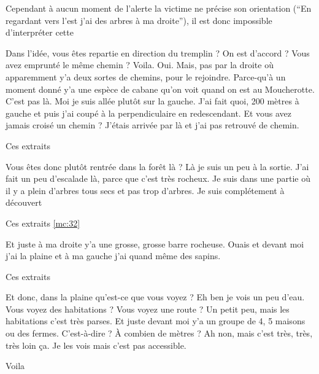 Cependant à aucun moment de l'alerte la
victime ne précise son orientation (\eg \enquote{En regardant vers
  l'est j'ai des arbres à ma droite}), il est donc impossible
d'interpréter cette 




\begin{dialogue*}
  \Sec {} Dans l’idée, vous êtes repartie en direction
  du tremplin ? On est d’accord ? Vous avez emprunté le même chemin ?
  \Req {} Voila. Oui.  Mais, pas par la
  droite où  apparemment y’a deux sortes de chemins,
  pour le rejoindre.  Parce-qu’à un moment donné y’a
  une espèce de cabane qu’on voit quand on est au Moucherotte. C’est
  pas là.  Moi je suis allée plutôt sur la
  gauche. J’ai fait quoi, 200 mètres à gauche et  puis
  j’ai coupé à la perpendiculaire en redescendant.
  \Sec {} Et vous avez jamais croisé un chemin ?
  \Req {} J’étais arrivée par là et j’ai pas retrouvé de
  chemin.
\end{dialogue*}
% 
Ces extraits

\begin{dialogue*}
  \Sec {} Vous êtes donc plutôt rentrée dans la forêt là ?
  \Req {} Là je suis un peu à la
  sortie.  J’ai fait un peu d’escalade là,
   parce que c’est très rocheux.  Je
  suis dans une partie où il y a plein d’arbres tous secs et pas trop
  d’arbres. Je suis complétement à découvert
\end{dialogue*}
% 
Ces extraits \ref{mc:32}


\begin{dialogue*}
  \Req {} Et juste à ma droite y’a une grosse, grosse
  barre rocheuse.  Ouais et devant moi j’ai la plaine
  et  à ma gauche j’ai quand même des sapins.
\end{dialogue*}
% 
Ces extraits


\begin{dialogue*}
  \Sec {} Et donc, dans la plaine qu’est-ce que vous
  voyez ?
  \Req {} Eh ben je vois un peu d’eau.
  \Sec {} Vous voyez des habitations ? Vous voyez une
  route ?
  \Req {} Un petit peu, mais les habitations c’est très
  parses.  Et juste devant moi y’a un groupe de 4, 5
  maisons ou des fermes.
  \Sec {} C’est-à-dire ? À combien de mètres ?
  \Req {} Ah non, mais c’est très, très, très loin
  ça. Je les vois mais c’est pas accessible.
\end{dialogue*}
% 
Voila


